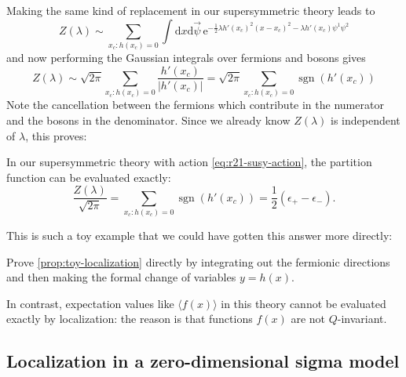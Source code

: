 \documentclass[12pt,letterpaper,reqno]{article}
\numberwithin{equation}{section}
\newcommand{\half}{\ensuremath{\frac{1}{2}}}
\newcommand{\e}{{\mathrm e}}
\newcommand{\de}{\mathrm{d}}
\newcommand{\abs}[1]{\lvert#1\rvert}
\newcommand{\IP}[1]{\langle#1\rangle}
\newcommand{\eps}{\epsilon}
\DeclareMathOperator{\sgn}{sgn}
\newcommand{\insfig}[2]{

\medskip
\noindent
\begin{minipage}{\linewidth}
\makebox[\linewidth]{\texttt{[image: figures/\#1-crop.pdf]}}
\end{minipage}
\noindent}
\newcommand{\fixme}[1]{{\color{orange}{[#1]}}}
\begin{document}
Making the same kind of replacement in our supersymmetric theory leads to
\begin{equation}
  Z(\lambda) \sim \sum_{x_c: h(x_c) = 0} \int \de x \de \vec\psi \, \e^{- \half \lambda h'(x_c)^2 (x-x_c)^2 - \lambda h'(x_c) \psi^1 \psi^2}
\end{equation}
and now performing the Gaussian integrals over fermions and bosons gives
\begin{equation}
  Z(\lambda) \sim \sqrt{2 \pi} \sum_{x_c: h(x_c) = 0} \frac{h'(x_c)}{\abs{h'(x_c)}} = \sqrt{2 \pi} \sum_{x_c: h(x_c) = 0} \sgn(h'(x_c))
\end{equation}
Note the cancellation between the fermions which contribute 
in the numerator and the bosons in the denominator.
Since we already know 
$Z(\lambda)$ is independent of $\lambda$, this proves:
\begin{prop} \label{prop:toy-localization}
In our supersymmetric theory with action \eqref{eq:r21-susy-action},
the partition function can be evaluated exactly:
\begin{equation}
  \frac{Z(\lambda)}{\sqrt{2\pi}} = \sum_{x_c: h(x_c) = 0} \sgn(h'(x_c)) = \half (\eps_+ - \eps_-).
\end{equation}
\end{prop}
\insfig{qft-geometry-15}{0.8}
This is such a toy example that we could have gotten this answer more directly:
\begin{exercise}
Prove \autoref{prop:toy-localization} directly by integrating
out the fermionic directions and then making the formal change of variables
$y = h(x)$.
\end{exercise}

\fixme{study the cancellation in perturbation theory?}

In contrast, expectation values like $\IP{f(x)}$ 
in this theory cannot be evaluated
exactly by localization: the reason is that
functions $f(x)$ are not
$Q$-invariant.


\subsection{Localization in a zero-dimensional sigma model}
\end{document}
